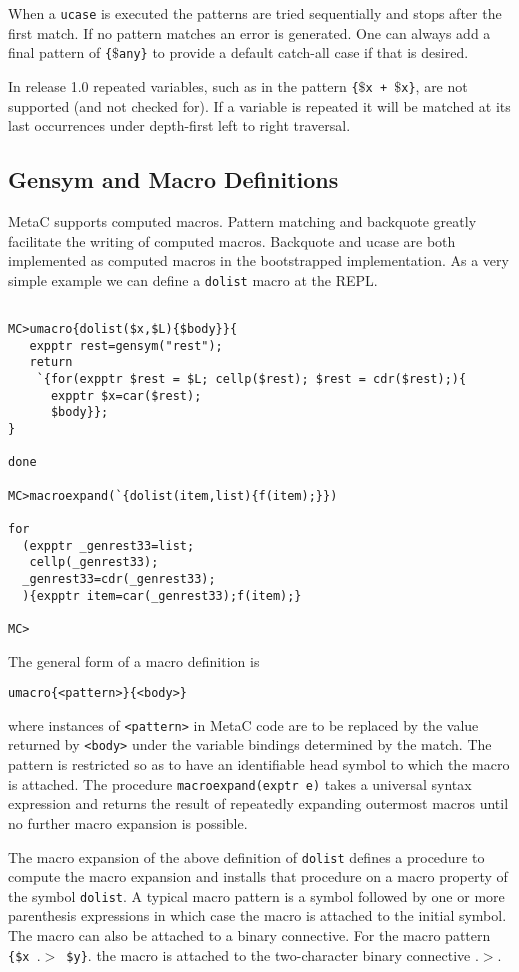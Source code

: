 \documentclass{article}
\begin{document}
When a {\tt ucase} is executed the patterns are tried sequentially and stops after the first match.  If no pattern matches an error is generated.
One can always add a final pattern of {\tt \{$\$$any\}} to provide a default
catch-all case if that is desired.

In release 1.0 repeated variables, such as in the pattern {\tt \{$\$$x + $\$$x\}}, are not supported (and not checked for).
If a variable is repeated it will be matched at its last occurrences under depth-first left to right traversal.

\subsection{Gensym and Macro Definitions}

MetaC supports computed macros.  Pattern matching and backquote greatly facilitate the writing of computed macros.  Backquote and ucase are both implemented as computed macros in the bootstrapped implementation. As a very simple example we can define a {\tt dolist} macro at the REPL.

\begin{verbatim}

MC>umacro{dolist($x,$L){$body}}{
   expptr rest=gensym("rest");
   return
    `{for(expptr $rest = $L; cellp($rest); $rest = cdr($rest);){
      expptr $x=car($rest);
      $body}};
}

done

MC>macroexpand(`{dolist(item,list){f(item);}})

for
  (expptr _genrest33=list;
   cellp(_genrest33);
  _genrest33=cdr(_genrest33);
  ){expptr item=car(_genrest33);f(item);}

MC>
\end{verbatim}

The general form of a macro definition is
\begin{verbatim}
umacro{<pattern>}{<body>}
\end{verbatim}
where instances of {\tt <pattern>} in MetaC code are to be replaced by
the value returned by {\tt <body>} under the variable bindings
determined by the match.  The pattern is restricted so as to have
an identifiable head symbol to which the macro is attached.
The procedure {\tt macroexpand(exptr e)} takes a
universal syntax expression and returns the result of repeatedly
expanding outermost macros until no further macro expansion is
possible.

The macro expansion of the above definition of {\tt dolist}
defines a procedure
to compute the macro expansion and installs that procedure on a macro
property of the symbol {\tt dolist}.  A typical macro pattern
is a symbol followed by one or more parenthesis
expressions in which case the macro is attached to the initial symbol.
The macro can also be attached to a binary connective.
For the macro pattern {\tt \{\$x $.\!>$ \$y\}}.
the macro is attached to the two-character binary connective $.\!>$.
\end{document}
